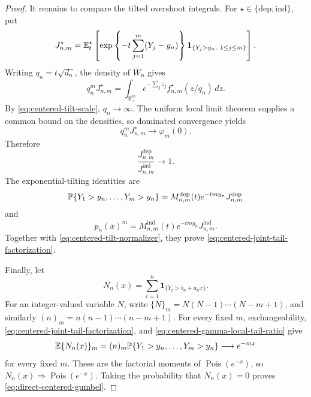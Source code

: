 \begin{proof}
It remains to compare the tilted overshoot integrals. For
\(\star\in\{\mathrm{dep},\mathrm{ind}\}\), put
\[
 J_{n,m}^{\star}
 =
 \mathbb E_t^\star\left[
  \exp\left\{-t\sum_{j=1}^m(Y_j-y_n)\right\}
  \mathbf1_{\{Y_j>y_n,\ 1\le j\le m\}}
 \right].
\]
Writing \(q_n=t\sqrt{d_n}\), the density of \(W_n\) gives
\[
 q_n^mJ_{n,m}^{\star}
 =
 \int_{\mathbb R_+^m}
 e^{-\sum_jz_j}
 f_{n,m}^{\star}(z/q_n)\,dz.
\]
By \eqref{eq:centered-tilt-scale}, \(q_n\to\infty\). The uniform local
limit theorem supplies a common bound on the densities, so dominated
convergence yields
\[
 q_n^mJ_{n,m}^{\star}\longrightarrow\varphi_m(0).
\]
Therefore
\[
 \frac{J_{n,m}^{\mathrm{dep}}}{J_{n,m}^{\mathrm{ind}}}\longrightarrow1.
\]
The exponential-tilting identities are
\[
 \mathbb P\{Y_1>y_n,\ldots,Y_m>y_n\}
 =
 M_{n,m}^{\mathrm{dep}}(t)e^{-tmy_n}J_{n,m}^{\mathrm{dep}}
\]
and
\[
 p_n(x)^m
 =
 M_{n,m}^{\mathrm{ind}}(t)e^{-tmy_n}J_{n,m}^{\mathrm{ind}}.
\]
Together with \eqref{eq:centered-tilt-normalizer}, they prove
\eqref{eq:centered-joint-tail-factorization}.

Finally, let
\[
 N_n(x)=\sum_{i=1}^n\mathbf1_{\{Y_i>b_n+a_nx\}}.
\]
For an integer-valued variable \(N\), write
\(\{N\}_m=N(N-1)\cdots(N-m+1)\), and similarly
\((n)_m=n(n-1)\cdots(n-m+1)\).
For every fixed \(m\), exchangeability,
\eqref{eq:centered-joint-tail-factorization}, and
\eqref{eq:centered-gamma-local-tail-ratio} give
\[
 \mathbb E\{N_n(x)\}_m
 =
 (n)_m\mathbb P\{Y_1>y_n,\ldots,Y_m>y_n\}
 \longrightarrow e^{-mx}
\]
for every fixed \(m\). These are the factorial moments of
\(\operatorname{Pois}(e^{-x})\), so
\(N_n(x)\Rightarrow\operatorname{Pois}(e^{-x})\). Taking the probability
that \(N_n(x)=0\) proves \eqref{eq:direct-centered-gumbel}.
\end{proof}

